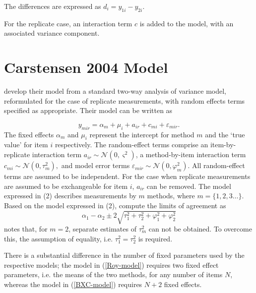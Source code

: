 \documentclass[12pt, a4paper]{report}
\theoremstyle{plain}
\theoremstyle{definition}
\theoremstyle{remark}
\begin{document}
The differences are expressed as $d_{i} = y_{1i} - y_{2i}$.

For the replicate case, an interaction term $c$ is added to the model, with an associated variance component.


\section{Carstensen 2004 Model}



\citet{BXC2008} develop their model from a standard two-way analysis of variance model, reformulated for the case of replicate measurements, with random effects terms specified as appropriate.
Their model can be written as

\begin{equation}\label{BXC-model}
y_{mir}  = \alpha_{m} + \mu_{i} + a_{ir} + c_{mi} + \varepsilon_{mir}.
\end{equation}
The fixed effects $\alpha_{m}$ and $\mu_{i}$ represent the intercept for method $m$ and the `true value' for item $i$ respectively. The random-effect terms comprise an item-by-replicate interaction term $a_{ir} \sim \mathcal{N}(0,\varsigma^{2})$, a method-by-item interaction term $c_{mi} \sim \mathcal{N}(0,\tau^{2}_{m}),$ and model error terms $\varepsilon_{mir} \sim \mathcal{N}(0,\varphi^{2}_{m}).$ All random-effect terms are assumed to be independent. For the case when replicate measurements are assumed to be exchangeable for item $i$, $a_{ir}$ can be removed. The model expressed in (2) describes measurements by $m$ methods, where $m = \{1,2,3\ldots\}$. Based on the model expressed in (2), \citet{BXC2008} compute the limits of agreement as
\[
\alpha_1 - \alpha_2 \pm 2 \sqrt{ \tau^2_1 +  \tau^2_2 +  \varphi^2_1 +  \varphi^2_2 }
\]
\citet{BXC2008} notes that, for $m=2$,  separate estimates of $\tau^2_m$ can not be obtained. To overcome this, the assumption of equality, i.e. $\tau^2_1 = \tau^2_2$ is required.

There is a substantial difference in the number of fixed parameters used by the respective models; the model in (\ref{Roy-model}) requires two fixed effect parameters, i.e. the means of the two methods, for any number of items $N$, whereas the model in (\ref{BXC-model}) requires $N+2$ fixed effects.
\end{document}
